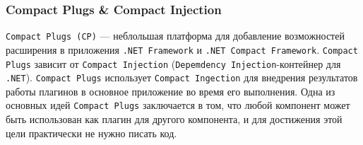 \subsubsection{Compact Plugs \& Compact Injection}

{\tt Compact Plugs (CP)} --- неблольшая платформа для добавление возможностей расширения в приложения {\tt .NET Framework} и {\tt .NET Compact Framework}. {\tt Compact Plugs} зависит от {\tt Compact Injection} ({\tt Depemdency Injection}-контейнер для {\tt .NET}). {\tt Compact Plugs} использует {\tt Compact Ingection} для внедрения результатов работы плагинов в основное приложение во время его выполнения. Одна из основных идей {\tt Compact Plugs} заключается в том, что любой компонент может быть использован как плагин для другого компонента, и для достижения этой цели практически не нужно писать код. 

